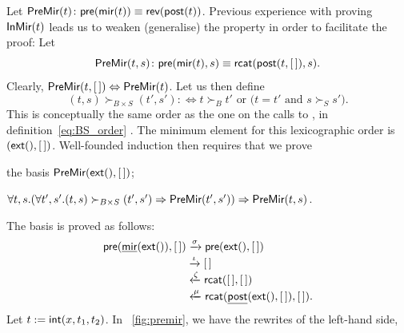 Let \(\textsf{PreMir}({t}) \colon \textsf{pre}(\textsf{mir}(t)) \equiv
\textsf{rev}(\textsf{post}(t))\). Previous
experience with proving \(\textsf{InMir}({t})\) leads us to weaken
(generalise) the property in order to facilitate the proof: Let
\begin{equation*}
  \pred{PreMir}{t,s} \colon \fun{pre}(\fun{mir}(t),s) \equiv
  \fun{rcat}(\fun{post}(t,\el),s).
  \index{rcat@\fun{rcat/2}}
\end{equation*}
Clearly, \(\textsf{PreMir}({t,[\,]}) \Leftrightarrow
\textsf{PreMir}({t})\). Let us then define
\begin{equation*}
  (t,s) \succ_{B \times S} (t',s') :\Leftrightarrow \text{\(t \succ_{B}
    t'\) or (\(t = t'\) and \(s \succ_{S} s'\))}.
\end{equation*}
This is conceptually the same order as the one on the calls to
, in definition~\eqref{eq:BS_order}
. The minimum element for this lexicographic
order is \((\textsf{ext}(),[\,])\). Well\hyp{}founded induction then
requires that we prove
\begin{itemize*}

  \item the basis \(\textsf{PreMir}({\textsf{ext}(),[\,]})\);

  \item \(\forall t,s. (\forall t',s'.(t,s) \succ_{B \times S} (t',s')
    \Rightarrow \textsf{PreMir}({t',s'})) \Rightarrow
    \textsf{PreMir}({t,s})\).

\end{itemize*}
The basis is proved as follows:
\begin{align*}
  \textsf{pre}(\underline{\textsf{mir}}(\textsf{ext}()),[\,])
  &\xrightarrow{\smash{\sigma}} \textsf{pre}(\textsf{ext}(),[\,])\\
  &\xrightarrow{\smash{\iota}} [\,]\\
  &\xleftarrow{\smash{\zeta}} \textsf{rcat}([\,],[\,])\\
  &\xleftarrow{\smash{\mu}}
  \textsf{rcat}(\underline{\textsf{post}}(\textsf{ext}(),[\,]),[\,]).
\end{align*}
Let \(t := \textsf{int}(x,t_1,t_2)\). In \fig~\vref{fig:premir}, we have
the rewrites of the left\hyp{}hand side,
